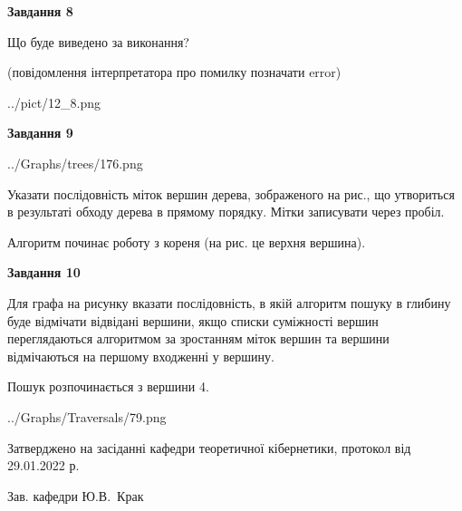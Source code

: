 \documentclass[12pt, ukrainian]{article}
\begin{document}
{\begin {large}
{\begin {center}\textbf{Завдання 8}\end {center}}\par
Що буде виведено за виконання?\par
 (повідомлення інтерпретатора про помилку позначати error)\par
\begin{center}
	{../pict/12_8.png}
\end{center}
\newpage

{\begin {center}\textbf{Завдання 9}\end {center}}\par

\begin{center}
	{../Graphs/trees/176.png}
\end{center}
Указати послідовність міток вершин дерева, зображеного на рис., що утвориться в результаті обходу дерева в прямому порядку. Мітки записувати через пробіл.\par Алгоритм починає роботу з кореня (на рис. це верхня вершина).\par
\newpage

{\begin {center}\textbf{Завдання 10}\end {center}}\par
Для графа на рисунку вказати послідовність, в якій алгоритм пошуку в глибину буде відмічати відвідані вершини, якщо списки суміжності вершин переглядаються алгоритмом за зростанням міток вершин та вершини відмічаються на першому вход\-женні у вершину.\par
Пошук розпочинається з вершини 4.\par

\begin{center}
	{../Graphs/Traversals/79.png}
\end{center}\par
\newpage


\end {large}
}
{\smallskip \begin {small} Затверджено на засіданні кафедри теоретичної кібернетики, протокол  від   29.01.2022 р.\par\smallskip\smallskip
{\parbox {6.5 cm}{Зав. кафедри \dotfill Ю.В.~Крак}} \end{small}}
\end{document}
